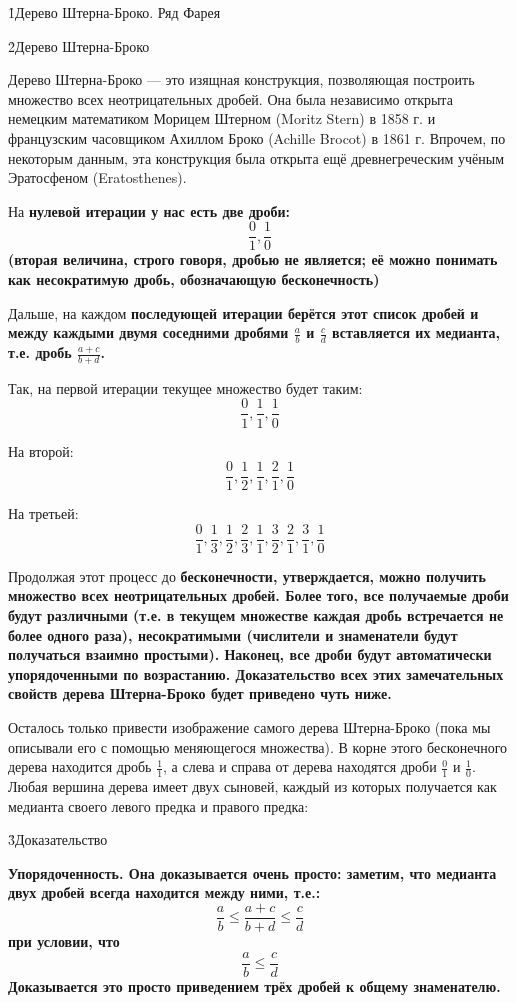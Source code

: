 \h1{Дерево Штерна-Броко. Ряд Фарея}

\h2{Дерево Штерна-Броко}

Дерево Штерна-Броко --- это изящная конструкция, позволяющая построить множество всех неотрицательных дробей. Она была независимо открыта немецким математиком Морицем Штерном (Moritz Stern) в 1858 г. и французским часовщиком Ахиллом Броко (Achille Brocot) в 1861 г. Впрочем, по некоторым данным, эта конструкция была открыта ещё древнегреческим учёным Эратосфеном (Eratosthenes).

На \bf{нулевой} итерации у нас есть две дроби:
$$ \frac{0}{1}, \frac{1}{0} $$
(вторая величина, строго говоря, дробью не является; её можно понимать как несократимую дробь, обозначающую бесконечность)

Дальше, на каждом \bf{последующей} итерации берётся этот список дробей и между каждыми двумя соседними дробями $\frac{a}{b}$ и $\frac{c}{d}$ вставляется их \bf{медианта}, т.е. дробь $\frac{a+c}{b+d}$.

Так, на первой итерации текущее множество будет таким:
$$ \frac{0}{1}, \frac{1}{1}, \frac{1}{0} $$

На второй:
$$ \frac{0}{1}, \frac{1}{2}, \frac{1}{1}, \frac{2}{1}, \frac{1}{0} $$

На третьей:
$$ \frac{0}{1}, \frac{1}{3}, \frac{1}{2}, \frac{2}{3}, \frac{1}{1}, \frac{3}{2}, \frac{2}{1}, \frac{3}{1}, \frac{1}{0} $$

Продолжая этот процесс до \bf{бесконечности}, утверждается, можно получить множество \bf{всех} неотрицательных дробей. Более того, все получаемые дроби будут \bf{различными} (т.е. в текущем множестве каждая дробь встречается не более одного раза), \bf{несократимыми} (числители и знаменатели будут получаться взаимно простыми). Наконец, все дроби будут автоматически \bf{упорядоченными} по возрастанию. Доказательство всех этих замечательных свойств дерева Штерна-Броко будет приведено чуть ниже.

Осталось только привести изображение самого дерева Штерна-Броко (пока мы описывали его с помощью меняющегося множества). В корне этого бесконечного дерева находится дробь $\frac{1}{1}$, а слева и справа от дерева находятся дроби $\frac{0}{1}$ и $\frac{1}{0}$. Любая вершина дерева имеет двух сыновей, каждый из которых получается как медианта своего левого предка и правого предка:


\h3{Доказательство}

\bf{Упорядоченность}. Она доказывается очень просто: заметим, что медианта двух дробей всегда находится между ними, т.е.:
$$ \frac{a}{b} \le \frac{a+c}{b+d} \le \frac{c}{d} $$
при условии, что
$$ \frac{a}{b} \le \frac{c}{d} $$
Доказывается это просто приведением трёх дробей к общему знаменателю.

